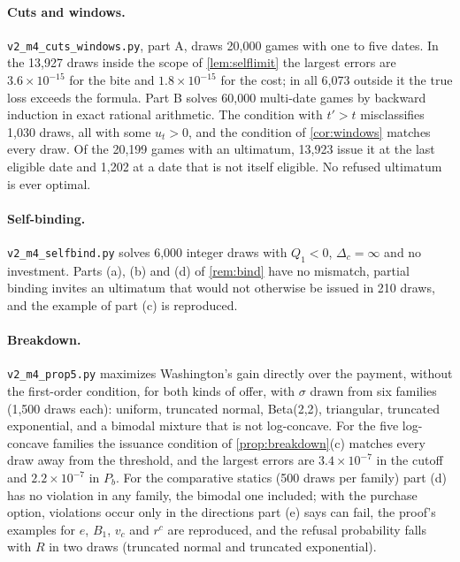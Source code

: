 \paragraph{Cuts and windows.} \texttt{v2\_m4\_cuts\_windows.py}, part A, draws 20,000 games with one to five dates. In the 13,927 draws inside the scope of \cref{lem:selflimit} the largest errors are $3.6\times10^{-15}$ for the bite and $1.8\times10^{-15}$ for the cost; in all 6,073 outside it the true loss exceeds the formula. Part B solves 60,000 multi-date games by backward induction in exact rational arithmetic. The condition with $t'>t$ misclassifies 1,030 draws, all with some $u_t>0$, and the condition of \cref{cor:windows} matches every draw. Of the 20,199 games with an ultimatum, 13,923 issue it at the last eligible date and 1,202 at a date that is not itself eligible. No refused ultimatum is ever optimal.

\paragraph{Self-binding.} \texttt{v2\_m4\_selfbind.py} solves 6,000 integer draws with $Q_1<0$, $\Delta_c=\infty$ and no investment. Parts (a), (b) and (d) of \cref{rem:bind} have no mismatch, partial binding invites an ultimatum that would not otherwise be issued in 210 draws, and the example of part (c) is reproduced.

\paragraph{Breakdown.} \texttt{v2\_m4\_prop5.py} maximizes Washington's gain directly over the payment, without the first-order condition, for both kinds of offer, with $\sigma$ drawn from six families (1,500 draws each): uniform, truncated normal, Beta(2,2), triangular, truncated exponential, and a bimodal mixture that is not log-concave. For the five log-concave families the issuance condition of \cref{prop:breakdown}(c) matches every draw away from the threshold, and the largest errors are $3.4\times10^{-7}$ in the cutoff and $2.2\times10^{-7}$ in $P_b$. For the comparative statics (500 draws per family) part (d) has no violation in any family, the bimodal one included; with the purchase option, violations occur only in the directions part (e) says can fail, the proof's examples for $e$, $B_1$, $v_c$ and $r^c$ are reproduced, and the refusal probability falls with $R$ in two draws (truncated normal and truncated exponential).


